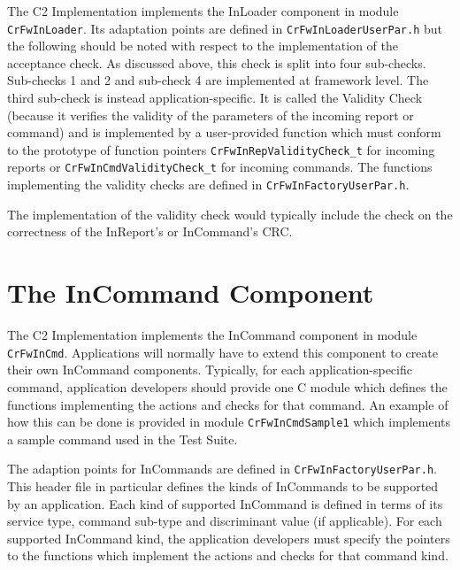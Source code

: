 \documentclass{pnp_article}
\begin{document}
The C2 Implementation implements the InLoader component in module \texttt{CrFwInLoader}. Its adaptation points are defined in \texttt{CrFwInLoaderUserPar.h} but the following should be noted with respect to the implementation of the acceptance check. As discussed above, this check is split into four sub-checks. Sub-checks 1 and 2 and sub-check 4 are implemented at framework level. The third sub-check is instead application-specific. It is called the Validity Check (because it verifies the validity of the parameters of the incoming report or command) and is implemented by a user-provided function which must conform to the prototype of function pointers \texttt{CrFwInRepValidityCheck\_t} for incoming reports or \texttt{CrFwInCmdValidityCheck\_t} for incoming commands. The functions implementing the validity checks are defined in \texttt{CrFwInFactoryUserPar.h}.

The implementation of the validity check would typically include the check on the correctness of the InReport's or InCommand's CRC.

\section{The InCommand Component}\label{sec:InCommand}


The C2 Implementation implements the InCommand component in module \texttt{CrFwInCmd}. Applications will normally have to extend this component to create their own InCommand components. Typically, for each application-specific command, application developers should provide one C module which defines the functions implementing the actions and checks for that command. An example of how this can be done is provided in module \texttt{CrFwInCmdSample1} which implements a sample command used in the Test Suite.

The adaption points for InCommands are defined in \texttt{CrFwInFactoryUserPar.h}. This header file in particular defines the kinds of InCommands to be supported by an application. Each kind of supported InCommand is defined in terms of its service type, command sub-type and discriminant value (if applicable). For each supported InCommand kind, the application developers must specify the pointers to the functions which implement the actions and checks for that command kind.


\end{document}
